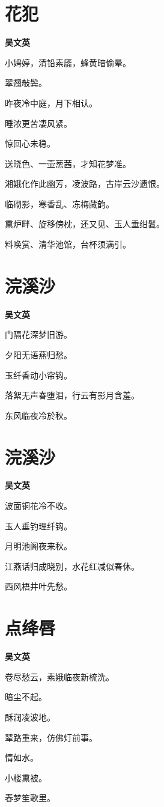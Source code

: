 \documentclass[12pt,a4paper]{ctexbook}
\begin{document}
\section{花犯}
\textbf{吴文英}\par\vspace{0.5em}
小娉婷，清铅素靥，蜂黄暗偷晕。\par
翠翘敧鬓。\par
昨夜冷中庭，月下相认。\par
睡浓更苦凄风紧。\par
惊回心未稳。\par
送晓色、一壶葱茜，才知花梦准。\par
湘娥化作此幽芳，凌波路，古岸云沙遗恨。\par
临砌影，寒香乱、冻梅藏韵。\par
熏炉畔、旋移傍枕，还又见、玉人垂绀鬒。\par
料唤赏、清华池馆，台杯须满引。\par

\section{浣溪沙}
\textbf{吴文英}\par\vspace{0.5em}
门隔花深梦旧游。\par
夕阳无语燕归愁。\par
玉纤香动小帘钩。\par
落絮无声春堕泪，行云有影月含羞。\par
东风临夜冷於秋。\par

\section{浣溪沙}
\textbf{吴文英}\par\vspace{0.5em}
波面铜花冷不收。\par
玉人垂钓理纤钩。\par
月明池阁夜来秋。\par
江燕话归成晓别，水花红减似春休。\par
西风梧井叶先愁。\par

\section{点绛唇}
\textbf{吴文英}\par\vspace{0.5em}
卷尽愁云，素娥临夜新梳洗。\par
暗尘不起。\par
酥润凌波地。\par
辇路重来，仿佛灯前事。\par
情如水。\par
小楼熏被。\par
春梦笙歌里。\par
\end{document}
